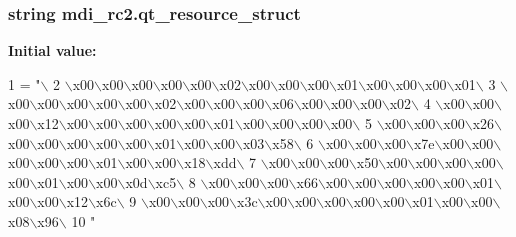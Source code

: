 \subsubsection[{qt\+\_\+resource\+\_\+struct}]{\setlength{\rightskip}{0pt plus 5cm}string mdi\+\_\+rc2.\+qt\+\_\+resource\+\_\+struct}\label{namespacemdi__rc2_af25f51d558b81900241f3a1a5895d98f}
{\bfseries Initial value\+:}
\begin{DoxyCode}
1 = \textcolor{stringliteral}{"\(\backslash\)}
2 \textcolor{stringliteral}{\(\backslash\)x00\(\backslash\)x00\(\backslash\)x00\(\backslash\)x00\(\backslash\)x00\(\backslash\)x02\(\backslash\)x00\(\backslash\)x00\(\backslash\)x00\(\backslash\)x01\(\backslash\)x00\(\backslash\)x00\(\backslash\)x00\(\backslash\)x01\(\backslash\)}
3 \textcolor{stringliteral}{\(\backslash\)x00\(\backslash\)x00\(\backslash\)x00\(\backslash\)x00\(\backslash\)x00\(\backslash\)x02\(\backslash\)x00\(\backslash\)x00\(\backslash\)x00\(\backslash\)x06\(\backslash\)x00\(\backslash\)x00\(\backslash\)x00\(\backslash\)x02\(\backslash\)}
4 \textcolor{stringliteral}{\(\backslash\)x00\(\backslash\)x00\(\backslash\)x00\(\backslash\)x12\(\backslash\)x00\(\backslash\)x00\(\backslash\)x00\(\backslash\)x00\(\backslash\)x00\(\backslash\)x01\(\backslash\)x00\(\backslash\)x00\(\backslash\)x00\(\backslash\)x00\(\backslash\)}
5 \textcolor{stringliteral}{\(\backslash\)x00\(\backslash\)x00\(\backslash\)x00\(\backslash\)x26\(\backslash\)x00\(\backslash\)x00\(\backslash\)x00\(\backslash\)x00\(\backslash\)x00\(\backslash\)x01\(\backslash\)x00\(\backslash\)x00\(\backslash\)x03\(\backslash\)x58\(\backslash\)}
6 \textcolor{stringliteral}{\(\backslash\)x00\(\backslash\)x00\(\backslash\)x00\(\backslash\)x7e\(\backslash\)x00\(\backslash\)x00\(\backslash\)x00\(\backslash\)x00\(\backslash\)x00\(\backslash\)x01\(\backslash\)x00\(\backslash\)x00\(\backslash\)x18\(\backslash\)xdd\(\backslash\)}
7 \textcolor{stringliteral}{\(\backslash\)x00\(\backslash\)x00\(\backslash\)x00\(\backslash\)x50\(\backslash\)x00\(\backslash\)x00\(\backslash\)x00\(\backslash\)x00\(\backslash\)x00\(\backslash\)x01\(\backslash\)x00\(\backslash\)x00\(\backslash\)x0d\(\backslash\)xc5\(\backslash\)}
8 \textcolor{stringliteral}{\(\backslash\)x00\(\backslash\)x00\(\backslash\)x00\(\backslash\)x66\(\backslash\)x00\(\backslash\)x00\(\backslash\)x00\(\backslash\)x00\(\backslash\)x00\(\backslash\)x01\(\backslash\)x00\(\backslash\)x00\(\backslash\)x12\(\backslash\)x6c\(\backslash\)}
9 \textcolor{stringliteral}{\(\backslash\)x00\(\backslash\)x00\(\backslash\)x00\(\backslash\)x3c\(\backslash\)x00\(\backslash\)x00\(\backslash\)x00\(\backslash\)x00\(\backslash\)x00\(\backslash\)x01\(\backslash\)x00\(\backslash\)x00\(\backslash\)x08\(\backslash\)x96\(\backslash\)}
10 \textcolor{stringliteral}{"}
\end{DoxyCode}
